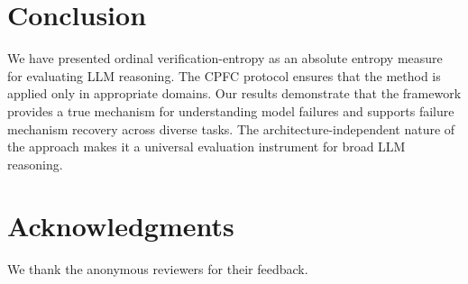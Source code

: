 \documentclass[11pt]{article}
\begin{document}
\section{Conclusion}
We have presented ordinal verification-entropy as an absolute entropy measure for evaluating LLM reasoning. The CPFC protocol ensures that the method is applied only in appropriate domains. Our results demonstrate that the framework provides a true mechanism for understanding model failures and supports failure mechanism recovery across diverse tasks. The architecture-independent nature of the approach makes it a universal evaluation instrument for broad LLM reasoning.

\section*{Acknowledgments}
We thank the anonymous reviewers for their feedback.
\end{document}
